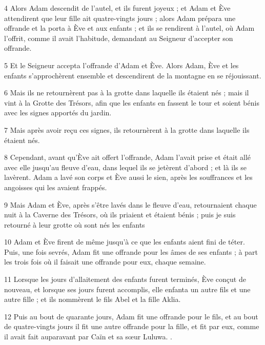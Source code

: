 \par 4 Alors Adam descendit de l'autel, et ils furent joyeux ; et Adam et Ève attendirent que leur fille ait quatre-vingts jours ; alors Adam prépara une offrande et la porta à Ève et aux enfants ; et ils se rendirent à l'autel, où Adam l'offrit, comme il avait l'habitude, demandant au Seigneur d'accepter son offrande.

\par 5 Et le Seigneur accepta l'offrande d'Adam et Ève. Alors Adam, Ève et les enfants s'approchèrent ensemble et descendirent de la montagne en se réjouissant.

\par 6 Mais ils ne retournèrent pas à la grotte dans laquelle ils étaient nés ; mais il vint à la Grotte des Trésors, afin que les enfants en fassent le tour et soient bénis avec les signes apportés du jardin.

\par 7 Mais après avoir reçu ces signes, ils retournèrent à la grotte dans laquelle ils étaient nés.

\par 8 Cependant, avant qu'Ève ait offert l'offrande, Adam l'avait prise et était allé avec elle jusqu'au fleuve d'eau, dans lequel ils se jetèrent d'abord ; et là ils se lavèrent. Adam a lavé son corps et Ève aussi le sien, après les souffrances et les angoisses qui les avaient frappés.

\par 9 Mais Adam et Ève, après s'être lavés dans le fleuve d'eau, retournaient chaque nuit à la Caverne des Trésors, où ils priaient et étaient bénis ; puis je suis retourné à leur grotte où sont nés les enfants

\par 10 Adam et Ève firent de même jusqu'à ce que les enfants aient fini de téter. Puis, une fois sevrés, Adam fit une offrande pour les âmes de ses enfants ; à part les trois fois où il faisait une offrande pour eux, chaque semaine.

\par 11 Lorsque les jours d'allaitement des enfants furent terminés, Ève conçut de nouveau, et lorsque ses jours furent accomplis, elle enfanta un autre fils et une autre fille ; et ils nommèrent le fils Abel et la fille Aklia.

\par 12 Puis au bout de quarante jours, Adam fit une offrande pour le fils, et au bout de quatre-vingts jours il fit une autre offrande pour la fille, et fit par eux, comme il avait fait auparavant par Caïn et sa sœur Luluwa. .

